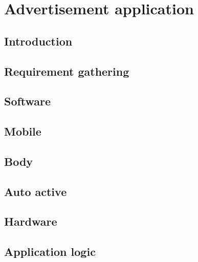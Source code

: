 \chapter{Advertisement application} %

\label{Chapter7} %

\section{Introduction}
\section{Requirement gathering}
\section{Software }
\section{Mobile}
\section{Body}
\section{Auto active}
\section{Hardware}
\section{Application logic}
